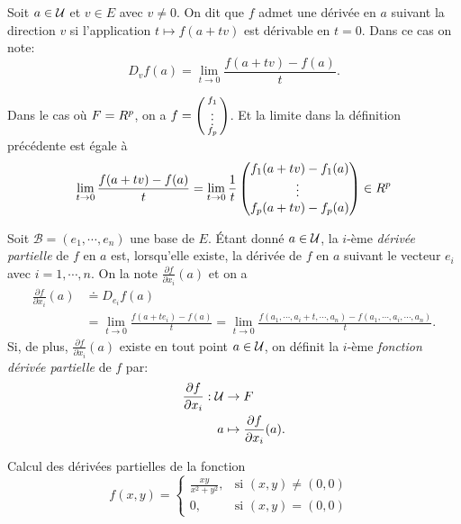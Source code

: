 \begin{definition} 
    Soit $a\in \mathcal{U}$ et $v\in E$ avec $v\neq 0$. On dit que $f$ admet une dérivée en $a$ suivant la direction $v$ si l'application $t\mapsto f(a+tv) $ est dérivable en $t=0$. Dans ce cas on note:
    \[
        D_v f(a) = \lim_{t\to 0} \frac{f(a+tv) - f(a)}{t}.
    \]
\end{definition}
\begin{remark}
    Dans le cas où $F =R^p$, on a $f = \begin{psmallmatrix}
        f_1 \\ \vdots \\ f_p
    \end{psmallmatrix}$. Et la limite dans la définition précédente est égale à 
    \[
        \lim_{t\to 0} \frac{f(a+tv) - f(a)}{t} =\lim_{t\to 0} 	\frac{1}{t} \begin{pmatrix}
            f_1(a+tv) - f_1(a)\\
            \vdots \\
            f_p(a+tv) - f_p(a)
        \end{pmatrix} \in \R^p
    \]
\end{remark}

\begin{definition}
    Soit  $\mathcal B=(e_1,\cdots,e_n)$ une base de $E$. \'Etant donné $a\in \mathcal{U}$, la $i$-ème \emph{dérivée partielle} de $f$ en $a$ est, lorsqu'elle existe, la dérivée de $f$ en $a$ suivant le vecteur $e_i$ avec $i=1,\cdots,n$. On la note $\frac{\partial f}{\partial x_i} (a)$ et on a
    \begin{align*}
        \frac{\partial f}{\partial x_i} (a) & \doteq D_{e_i} f(a) \\ &= \lim_{t\to 0} \frac{f(a+te_i) - f(a)}{t} = \lim_{t\to 0} \frac{f(a_1,\cdots,a_{i}+t,\cdots,a_n) - f(a_1,\cdots,a_i,\cdots,a_n)}{t}.
    \end{align*}
    Si, de plus, $\frac{\partial f}{\partial x_i} (a)$ existe en tout point $a\in \mathcal{U}$, on définit la $i$-ème \emph{fonction dérivée partielle} de $f$ par: 
    \begin{align*}
        \frac{\partial f}{\partial x_i}: \mathcal{U} &\to F \\
        a & \mapsto \frac{\partial f}{\partial x_i} (a).
    \end{align*}
\end{definition}


\begin{exemple}
    Calcul des dérivées partielles de la fonction	\[f(x,y)= \begin{cases}\frac{xy}{x^2+y^2}, &\text{si $(x,y) \neq (0,0)$} \\ 0, & \text{si $(x,y) =(0,0)$ }\end{cases}\]
    \pl{\rep{6cm}}
\end{exemple}

